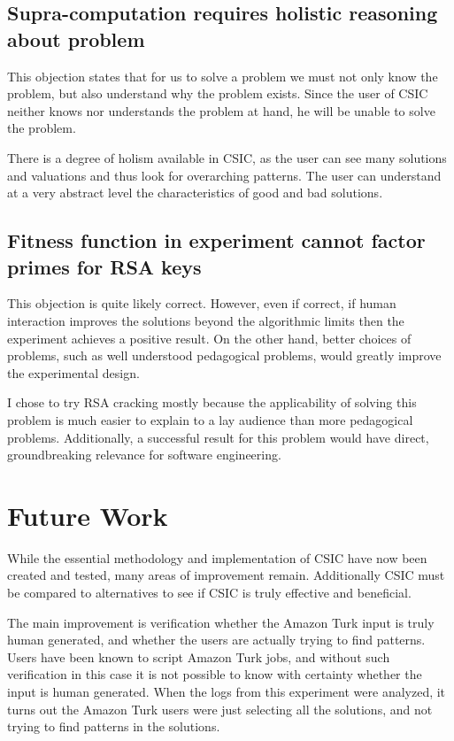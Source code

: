 \subsection{Supra-computation requires holistic reasoning about problem}

This objection states that for us to solve a problem we must not only know the problem, but also understand why the problem exists. Since the user of CSIC neither knows nor understands the problem at hand, he will be unable to solve the problem.

There is a degree of holism available in CSIC, as the user can see many solutions and valuations and thus look for overarching patterns. The user can understand at a very abstract level the characteristics of good and bad solutions.

\subsection{Fitness function in experiment cannot factor primes for RSA keys} 

This objection is quite likely correct.  However, even if correct, if human interaction improves the solutions beyond the algorithmic limits then the experiment achieves a positive result.  On the other hand, better choices of problems, such as well understood pedagogical problems, would greatly improve the experimental design.  

I chose to try RSA cracking mostly because the applicability of solving this problem is much easier to explain to a lay audience than more pedagogical problems.  Additionally, a successful result for this problem would have direct, groundbreaking relevance for software engineering.

\section{Future Work}\label{sec:future-work}

While the essential methodology and implementation of CSIC have now been created and tested, many areas of improvement remain.  Additionally CSIC must be compared to alternatives to see if CSIC is truly effective and beneficial.

The main improvement is verification whether the Amazon Turk input is truly human generated, and whether the users are actually trying to find patterns.  Users have been known to script Amazon Turk jobs, and without such verification in this case it is not possible to know with certainty whether the input is human generated.  When the logs from this experiment were analyzed, it turns out the Amazon Turk users were just selecting all the solutions, and not trying to find patterns in the solutions.

